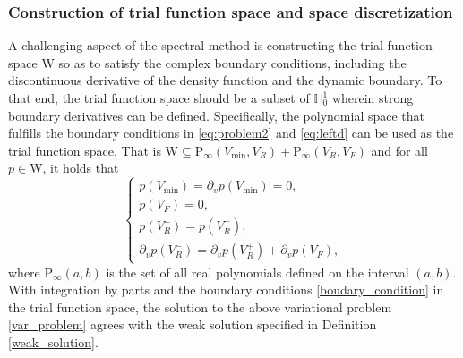 \subsubsection{Construction of trial function space and space discretization}
A challenging aspect of the spectral method is constructing the trial function space $\mathrm{W}$ so as to satisfy the complex boundary conditions, including the discontinuous derivative of the density function and the dynamic boundary. To that end, the trial function space should be a subset of $\mathbb{H}^1_0$ wherein strong boundary derivatives can be defined. Specifically, the polynomial space that fulfills the boundary conditions in \eqref{eq:problem2} and \eqref{eq:leftd} can be used as the trial function space. That is $\mathrm{W} \subseteq \mathrm{P}_{\infty}(V_{\min}, V_R) + \mathrm{P}_{\infty}(V_{R}, V_F)$ and for all $ p\in \mathrm{W}$, it holds that
\begin{equation}
    \label{boudary_condition}
    \begin{cases}
        p(V_{\min})=\partial _vp(V_{\min})=0,\\
        p(V_F)=0,\\
        p(V^-_R)=p(V^+_R),\\
        \partial _vp(V^-_R)=\partial _vp(V^+_R)+\partial _vp(V_F),
    \end{cases}
\end{equation}
where $\mathrm{P}_{\infty}(a,b)$ is the set of all real polynomials defined on the interval $(a, b)$. 
With integration by parts and the boundary conditions \eqref{boudary_condition} in the trial function space, the solution to the above variational problem \eqref{var_problem} agrees with the weak solution specified in Definition \ref{weak_solution}. 


